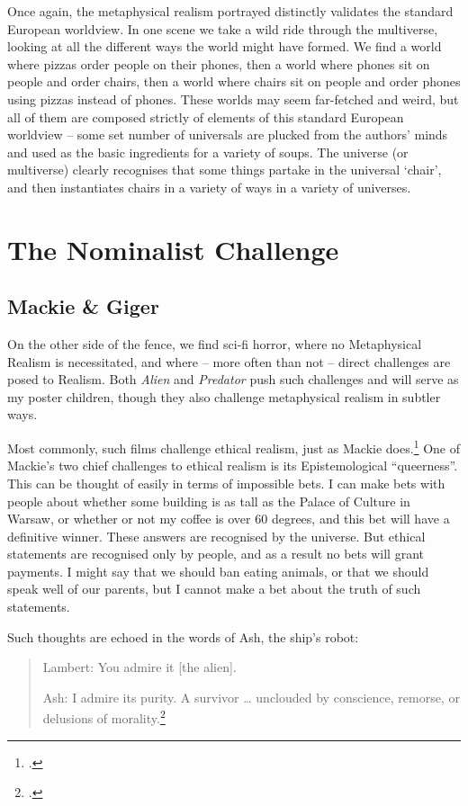 \documentclass{article}
\begin{document}
Once again, the metaphysical realism portrayed distinctly validates the standard European worldview. In one scene we
take a wild ride through the multiverse, looking at all the different ways the world might have formed. We find a world where pizzas order people on their phones, then a world where phones sit on people and order chairs, then a world where chairs sit on people and order phones using pizzas instead of phones. These worlds may seem far-fetched and weird, but all of them are composed strictly of elements of this standard European worldview -- some set number of universals are plucked from the authors' minds and used as the basic ingredients for a variety of soups. The universe (or multiverse) clearly recognises that some things partake in the universal `chair', and then instantiates chairs in a variety of ways in a variety of universes.

\section{The Nominalist Challenge}
\subsection{Mackie \& Giger}
On the other side of the fence, we find sci-fi horror, where no Metaphysical Realism is necessitated, and where -- more often than not -- direct challenges are posed to Realism. Both \textit{Alien} and \textit{Predator} push such challenges and will serve as my poster children, though they also challenge metaphysical realism in subtler ways.

Most commonly, such films challenge ethical realism, just as Mackie does.\footcite[p 38]{inventingrightwrong} One of Mackie's two chief challenges to ethical realism is its Epistemological ``queerness''. This can be thought of easily in terms of impossible bets. I can make bets with people about whether some building is as tall as the Palace of Culture in Warsaw, or whether or not my coffee is over 60 degrees, and this bet will have a definitive winner. These answers are recognised by the universe. But ethical statements are recognised only by people, and as a result no bets will grant payments. I might say that we should ban eating animals, or that we should speak well of our parents, but I cannot make a bet about the truth of such statements.

Such thoughts are echoed in the words of Ash, the ship's robot:

\begin{quotation}
Lambert: You admire it [the alien].

	Ash: I admire its purity. A survivor {\dots} unclouded by conscience, remorse, or delusions of morality.\footcite{alien}

\end{quotation}
\end{document}

